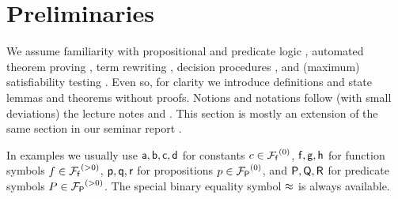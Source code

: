 
\section{Preliminaries}

We assume familiarity with propositional and predicate logic \cite{Huth:2004:LCS:975331}, 
automated theorem proving \cite{Fitting:1996:FLA:230183}, 
term rewriting \cite{Baader:1998:TR:280474}, 
decision procedures \cite{Kroening:2008:DPA:1391237}, 
and (maximum) satisfiability testing \cite{Biere:2009:HSV:1550723}.
Even so, for clarity we introduce
definitions and state lemmas and theorems without proofs.
Notions and notations follow (with small deviations) the lecture notes \cite{AM2015tr} and \cite{GM2013ar}.
This section is mostly an extension of the same section in our seminar report \cite{axm:SR2}.





In examples we usually use ${\mathsf a},{\mathsf b},{\mathsf c},{\mathsf d}$ for constants $c\in{{\mathcal F}_{\mathsf f}}^{(0)}$,
${\mathsf f},{\mathsf g},{\mathsf h}$ for function symbols $f\in{{\mathcal F}_{\mathsf f}}^{(>0)}$,
${\mathsf p},{\mathsf q},{\mathsf r}$ for propositions $p\in{{\mathcal F}_{\mathsf P}}^{(0)}$, and 
${\mathsf P},{\mathsf Q},{\mathsf R}$ for predicate symbols $P\in{{\mathcal F}_{\mathsf P}}^{(>0)}$.
The special binary equality symbol ${\mathsf \approx}$ is always available.



